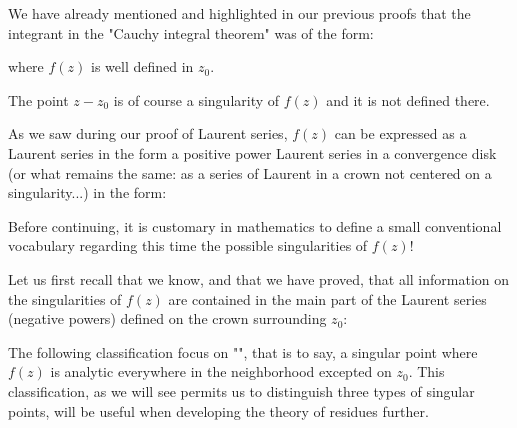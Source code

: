 	We have already mentioned and highlighted in our previous proofs that the integrant in the "Cauchy integral theorem" was of the form:
	
	where $f(z)$ is well defined in $z_0$.
	
	The point $z-z_0$ is of course a singularity of $f(z)$ and it is not defined there.
	
	As we saw during our proof of Laurent series, $f(z)$ can be expressed as a Laurent series in the form a positive power Laurent series in a convergence disk (or what remains the same: as a series of Laurent in a crown not centered on a singularity...) in the form:
	
	Before continuing, it is customary in mathematics to define a small conventional vocabulary regarding this time the possible singularities of $f(z)$!
	
	Let us first recall that we know, and that we have proved, that all information on the singularities of $f (z)$ are contained in the main part of the Laurent series (negative powers) defined on the crown surrounding $z_0$:
	
	The following classification focus on "", that is to say, a singular point where $f(z)$ is analytic everywhere in the neighborhood excepted on $z_0$. This classification, as we will see permits us to distinguish three types of singular points, will be useful when developing the theory of residues further.
	
